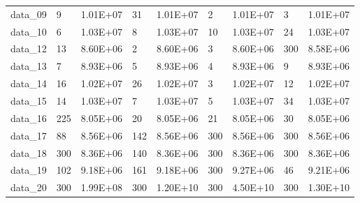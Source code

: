 \begin{table}[!h]
\begin{tabular}{lllllllll}
data\_09 & 9                   & 1.01E+07                & 31                    & 1.01E+07                 & 2                  & 1.01E+07               & 3                    & 1.01E+07                \\
data\_10 & 6                   & 1.03E+07                & 8                     & 1.03E+07                 & 10                 & 1.03E+07               & 24                   & 1.03E+07                \\
data\_12 & 13                  & 8.60E+06                & 2                     & 8.60E+06                 & 3                  & 8.60E+06               & 300                  & 8.58E+06                \\
data\_13 & 7                   & 8.93E+06                & 5                     & 8.93E+06                 & 4                  & 8.93E+06               & 9                    & 8.93E+06                \\
data\_14 & 16                  & 1.02E+07                & 26                    & 1.02E+07                 & 3                  & 1.02E+07               & 12                   & 1.02E+07                \\
data\_15 & 14                  & 1.03E+07                & 7                     & 1.03E+07                 & 5                  & 1.03E+07               & 34                   & 1.03E+07                \\
data\_16 & 225                 & 8.05E+06                & 20                    & 8.05E+06                 & 21                 & 8.05E+06               & 30                   & 8.05E+06                \\
data\_17 & 88                  & 8.56E+06                & 142                   & 8.56E+06                 & 300                & 8.56E+06               & 300                  & 8.56E+06                \\
data\_18 & 300                 & 8.36E+06                & 140                   & 8.36E+06                 & 300                & 8.36E+06               & 300                  & 8.36E+06                \\
data\_19 & 102                 & 9.18E+06                & 161                   & 9.18E+06                 & 300                & 9.27E+06               & 46                   & 9.21E+06                \\
data\_20 & 300                 & 1.99E+08                & 300                   & 1.20E+10                 & 300                & 4.50E+10               & 300                  & 1.30E+10                \\

\end{tabular}
\end{table}
